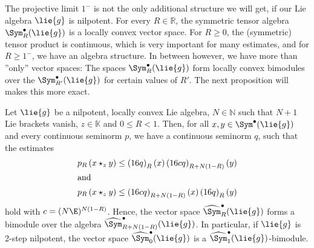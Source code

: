 The projective limit $1^-$ is not the only additional structure we will get, if 
our Lie algebra $\lie{g}$ is nilpotent. For every $R \in \mathbb{R}$, the 
symmetric tensor algebra $\Sym_R^{\bullet}(\lie{g})$ is a locally convex vector 
space. For $R \geq 0$, the (symmetric) tensor product is continuous, which is 
very important for many estimates, and for $R \geq 1^-$, we have an algebra 
structure. In between however, we have more than ''only'' vector spaces: The 
spaces $\Sym_R^{\bullet}(\lie{g})$ form locally convex bimodules over the 
$\Sym_{R'}^{\bullet}(\lie{g})$ for certain values of $R'$. The next proposition 
will makes this more exact.
\begin{proposition}
	\label{Nilpot:Prop:Bimodules}
	Let $\lie{g}$ be a nilpotent, locally convex Lie algebra, $N \in 
	\mathbb{N}$ such that $N + 1$ Lie brackets vanish, $z \in \mathbb{K}$ and 
	$0 \leq R < 1$. Then, for all $x, y \in \Sym^{\bullet}(\lie{g})$ and every 
	continuous seminorm $p$, we have a continuous seminorm $q$, such that the 
	estimates
	\begin{align}
		\label{Nilpot:BimoduleEstimate1}
		p_R \left(
			x \star_z y
		\right)
		& \leq
		\left(16 q\right)_R(x) 
		\left(16 c q\right)_{R + N(1-R)}(y)
		\\
	\intertext{and}
		\label{Nilpot:BimoduleEstimate2}
		p_R \left(
			x \star_z y
		\right)
		& \leq
		\left(16 c q\right)_{R + N(1-R)}(x)
		\left(16 q\right)_R(y) 
	\end{align}
	hold with $c = (N \E)^{N (1- R)}$.
	Hence, the vector space $\widehat{\Sym}_R^{\bullet}(\lie{g})$ forms a 
	bimodule over the algebra $\widehat{\Sym}_{R + N(1-R)}^{\bullet}(\lie{g})$. 
	In particular, if $\lie{g}$ is 2-step nilpotent, 
	the vector space $\widehat{\Sym}_0^{\bullet}(\lie{g})$ is a 
	$\widehat{\Sym}_1^{\bullet}(\lie{g})$-bimodule.
\end{proposition}
